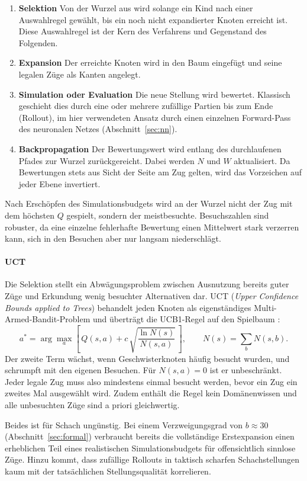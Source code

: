 \documentclass[
  a4paper, 12pt,
  parskip=half,
  headings=small,
  bibliography=totoc
]{scrartcl}
\begin{document}
\begin{enumerate}
  \item \textbf{Selektion} Von der Wurzel aus wird solange ein Kind nach       einer Auswahlregel gewählt, bis ein noch nicht expandierter Knoten erreicht  ist. Diese Auswahlregel ist der Kern des Verfahrens und Gegenstand des Folgenden.
  \item \textbf{Expansion} Der erreichte Knoten wird in den Baum eingefügt und seine legalen Züge als Kanten angelegt.
  \item \textbf{Simulation oder Evaluation} Die neue Stellung wird bewertet. Klassisch geschieht dies durch eine oder mehrere zufällige Partien bis zum Ende (Rollout), im hier verwendeten Ansatz durch einen einzelnen Forward-Pass des neuronalen Netzes (Abschnitt~\ref{sec:nn}).
  \item \textbf{Backpropagation} Der Bewertungswert wird entlang des durchlaufenen Pfades zur Wurzel zurückgereicht. Dabei werden \(N\) und \(W\) aktualisiert. Da Bewertungen stets aus Sicht der Seite am Zug gelten, wird das Vorzeichen auf jeder Ebene invertiert.
\end{enumerate}
Nach Erschöpfen des Simulationsbudgets wird an der Wurzel nicht der Zug mit dem höchsten \(Q\) gespielt, sondern der meistbesuchte. Besuchszahlen sind robuster, da eine einzelne fehlerhafte Bewertung einen Mittelwert stark verzerren kann, sich in den Besuchen aber nur langsam niederschlägt.

\paragraph{UCT}
Die Selektion stellt ein Abwägungsproblem zwischen Ausnutzung bereits guter Züge und Erkundung wenig besuchter Alternativen dar. UCT (\emph{Upper Confidence Bounds applied to Trees}) behandelt jeden Knoten als eigenständiges Multi-Armed-Bandit-Problem und überträgt die UCB1-Regel \autocite{auer2002finite} auf den Spielbaum \autocite{kocsis2006bandit}:
\[
  a^{*} = \arg\max_{a}\left[\,Q(s,a) + c\,\sqrt{\frac{\ln N(s)}{N(s,a)}}\,\right],
  \qquad N(s) = \sum_{b} N(s,b).
\]
Der zweite Term wächst, wenn Geschwisterknoten häufig besucht wurden, und schrumpft mit den eigenen Besuchen. Für \(N(s,a) = 0\) ist er unbeschränkt. Jeder legale Zug muss also mindestens einmal besucht werden, bevor ein Zug ein zweites Mal ausgewählt wird. Zudem enthält die Regel kein Domänenwissen und alle unbesuchten Züge sind a priori gleichwertig.
 
Beides ist für Schach ungünstig. Bei einem Verzweigungsgrad von \(b \approx 30\) (Abschnitt~\ref{sec:formal}) verbraucht bereits die vollständige Erstexpansion einen erheblichen Teil eines realistischen Simulationsbudgets für offensichtlich sinnlose Züge. Hinzu kommt, dass zufällige Rollouts in taktisch scharfen Schachstellungen kaum mit der tatsächlichen Stellungsqualität korrelieren.
\end{document}
